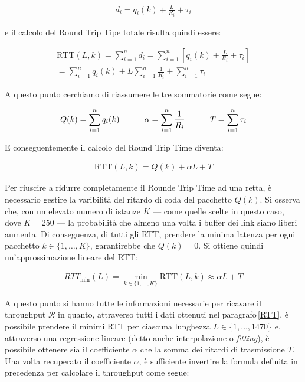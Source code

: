 \begin{gather*}
    d_i = q_i(k) + \frac{L}{R_i} + \tau_i
\end{gather*}

\noindent e il calcolo del Round Trip Tipe totale risulta quindi essere:

\begin{gather*}
    \text{RTT}(L, k) = \sum_{i = 1}^n d_i = \sum_{i = 1}^n\left[q_i(k) + \frac{L}{R_i} + \tau_i\right] \\
    = \sum_{i = 1}^n q_i(k) + L\sum_{i = 1}^n\frac{1}{R_i} + \sum_{i = 1}^n\tau_i
\end{gather*}

\noindent A questo punto cerchiamo di riassumere le tre sommatorie come segue:

\begin{gather*}
    Q(k) = \sum_{i = 1}^n q_i(k) \hspace{30px} \alpha = \sum_{i = 1}^n\frac{1}{R_i} \hspace{30px} T = \sum_{i = 1}^n\tau_i
\end{gather*}

\noindent E conseguentemente il calcolo del Round Trip Time diventa:

\begin{gather*}
    \text{RTT}(L, k) = Q(k) + \alpha L + T
\end{gather*}

\noindent Per riuscire a ridurre completamente il Rounde Trip Time ad una retta, è necessario gestire la varibilità del ritardo di coda del pacchetto $Q(k)$. Si osserva che, con un elevato numero di istanze $K$ — come quelle scelte in questo caso, dove $K = 250$ — la probabilità che almeno una volta i buffer dei link siano liberi aumenta. Di conseguenza, di tutti gli RTT, prendere la minima latenza per ogni pacchetto $k \in \{1, \dots, K\}$, garantirebbe che $Q(k) = 0$. Si ottiene quindi un'approssimazione lineare del RTT\@:

\begin{gather*}
    RTT_{\text{min}}(L) = \min_{k \in \{1, \dots, K\}} \text{RTT}(L, k) \approx \alpha L + T
\end{gather*}

\noindent A questo punto si hanno tutte le informazioni necessarie per ricavare il throughput $\mathcal{R}$ in quanto, attraverso tutti i dati ottenuti nel paragrafo\,\ref{RTT}, è possibile prendere il minimi RTT per ciascuna lunghezza $L \in \{1,\dots, 1470\}$ e, attraverso una regressione lineare (detto anche interpolazione o \textsl{fitting}), è possibile ottenere sia il coefficiente $\alpha$ che la somma dei ritardi di trasmissione $T$. Una volta recuperato il coefficiente $\alpha$, è sufficiente invertire la formula definita in precedenza per calcolare il throughput come segue:

